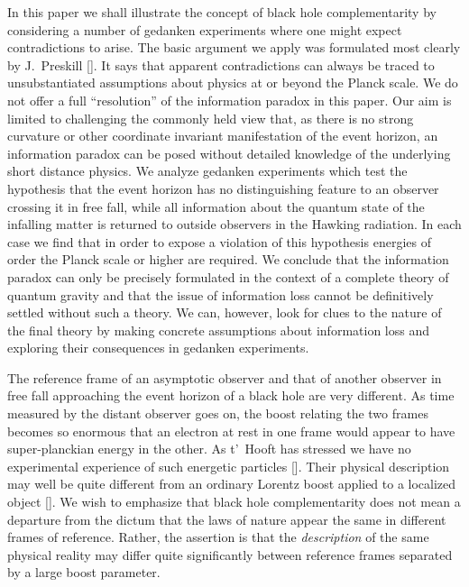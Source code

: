 In this paper we shall illustrate the concept of black hole
complementarity by considering a number of gedanken experiments where
one might expect contradictions to arise.  The basic argument we
apply was formulated most clearly by J.~Preskill [\johnpri].  It says
that apparent contradictions can always be traced to unsubstantiated
assumptions about physics at or beyond the Planck scale.  We do not
offer a full ``resolution'' of the information paradox in this paper.
 Our aim is limited to challenging the commonly held view that, as
there is no strong curvature or other coordinate invariant
manifestation of the event horizon, an information paradox can be
posed without detailed knowledge of the underlying short distance
physics.  We analyze gedanken experiments which test the hypothesis
that the event horizon has no distinguishing feature to an observer
crossing it in free fall, while all information about the quantum
state of the infalling matter is returned to outside observers in the
Hawking radiation.  In each case we find that in order to expose a
violation of this hypothesis energies of order the Planck scale or
higher are required.  We conclude that the information paradox can
only be precisely formulated in the context of a complete theory of
quantum gravity and that the issue of information loss cannot be
definitively settled without such a theory.  We can, however, look
for clues to the nature of the final theory by making concrete
assumptions about information loss and exploring their consequences
in gedanken experiments.

The reference frame of an asymptotic observer and that of another
observer in free fall approaching the event horizon of a black hole
are very different.  As time measured by the distant observer goes
on, the boost relating the two frames becomes so enormous that an
electron at rest in one frame would appear to have super-planckian
energy in the other.  As t'~Hooft has stressed we have no
experimental experience of such energetic particles [\thooftone].
Their physical description may well be quite different from an
ordinary Lorentz boost applied to a localized object [\lenny].  We
wish to emphasize that black hole complementarity does not mean a
departure from the dictum that the laws of nature appear the same in
different frames of reference.  Rather, the assertion is that the
{\it description} of the same physical reality may differ quite
significantly between reference frames separated by a large boost
parameter.

